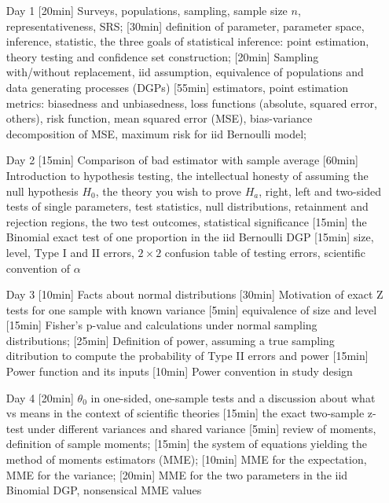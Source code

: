 \begin{enumerate}
\item[Day 1] [20min] Surveys, populations, sampling, sample size $n$, representativeness, SRS; [30min] definition of parameter, parameter space, inference, statistic, the three goals of statistical inference: point estimation, theory testing and confidence set construction; [20min] Sampling with/without replacement, iid assumption, equivalence of populations and data generating processes (DGPs) [55min] estimators, point estimation metrics: biasedness and unbiasedness, loss functions (absolute, squared error, others), risk function, mean squared error (MSE), bias-variance decomposition of MSE, maximum risk for iid Bernoulli model; 

\item[Day 2] [15min] Comparison of bad estimator with sample average [60min] Introduction to hypothesis testing, the intellectual honesty of assuming the null hypothesis $H_0$, the theory you wish to prove $H_a$, right, left and two-sided tests of single parameters, test statistics, null distributions, retainment and rejection regions, the two test outcomes, statistical significance [15min] the Binomial exact test of one proportion in the iid Bernoulli DGP [15min] size, level, Type I and II errors, $2 \times 2$ confusion table of testing errors, scientific convention of $\alpha$

\item[Day 3] [10min] Facts about normal distributions [30min] Motivation of exact Z tests for one sample with known variance [5min] equivalence of size and level [15min] Fisher's p-value and calculations under normal sampling distributions; [25min] Definition of power, assuming a true sampling ditribution to compute the probability of Type II errors and power [15min] Power function and its inputs [10min] Power convention in study design


\item[Day 4] [20min] $\theta_0$ in one-sided, one-sample tests and a discussion about what  vs  means in the context of scientific theories [15min] the exact two-sample z-test under different variances and shared variance [5min] review of moments, definition of sample moments; [15min] the system of equations yielding the method of moments estimators (MME); [10min] MME for the expectation, MME for the variance; [20min] MME for the two parameters in the iid Binomial DGP, nonsensical MME values



\end{enumerate}
